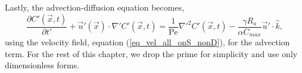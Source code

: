 \par
Lastly, the advection-diffusion equation becomes, 
	\begin{equation}
	\frac{\partial C'(\vec{x},t)}{\partial t'}
	+ \vec{u}'(\vec{x}) \cdot \nabla' C'(\vec{x},t)
	 = \frac{1}{\textrm{Pe}} {\nabla'}^2 C'(\vec{x},t)
	 -\frac{\gamma R_a}{ \alpha C_{max}} \vec{u}' \cdot \hat{k},
	\label{eq_AD_nonD}
	\end{equation}
using the velocity field, equation (\ref{eq_vel_all_onS_nonD}), for the advection term.
For the rest of this chapter, we drop the prime for simplicity and use only dimensionless forms. 

